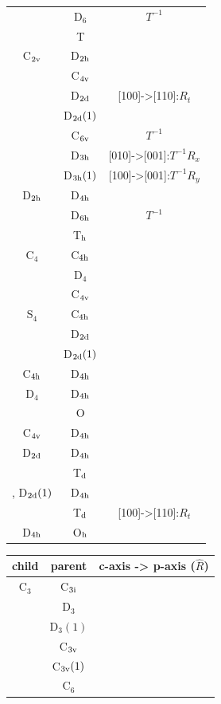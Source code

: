 \documentclass[11pt]{easymemo}
\begin{document}
\begin{table}[t]
\begin{center}
\begin{tabular}{ccc}
   & D$_6$ & $T^{-1}$ \\
   & T & \\ \hline
C$_{\rm 2v}$ & D$_{\rm 2h}$ & \\
    & C$_{\rm 4v}$ & \\
    & D$_{\rm 2d}$ & [100]->[110]:$R_t$ \\
    & D$_{\rm 2d}(1)$ & \\
    & C$_{\rm 6v}$ & $T^{-1}$ \\
    & D$_{\rm 3h}$ & [010]->[001]:$T^{-1}R_x$ \\
    & D$_{\rm 3h}(1)$ & [100]->[001]:$T^{-1}R_y$ \\ \hline
D$_{\rm 2h}$ & D$_{\rm 4h}$ & \\
    & D$_{\rm 6h}$ & $T^{-1}$ \\
    & T$_{\rm h}$ & \\ \hline\hline
C$_4$ & C$_{\rm 4h}$ & \\
   & D$_4$ & \\
   & C$_{\rm 4v}$ & \\ \hline
S$_4$ & C$_{\rm 4h}$ & \\
   & D$_{\rm 2d}$ & \\
   & D$_{\rm 2d}(1)$ & \\ \hline
C$_{\rm 4h}$ & D$_{\rm 4h}$ & \\ \hline
D$_4$ & D$_{\rm 4h}$ & \\
   & O & \\ \hline
C$_{\rm 4v}$ & D$_{\rm 4h}$ & \\ \hline
D$_{\rm 2d}$ & D$_{\rm 4h}$ & \\
    & T$_{\rm d}$ & \\ \hline,
D$_{\rm 2d}(1)$ & D$_{\rm 4h}$ & \\
      & T$_{\rm d}$ & [100]->[110]:$R_t$ \\ \hline
D$_{\rm 4h}$ & O$_{\rm h}$ & \\ \hline\hline
\end{tabular}
\hspace{1cm}
\begin{tabular}{ccc} \hline\hline
child & parent & c-axis -> p-axis ($\hat{R}$) \\ \hline
C$_3$ & C$_{\rm 3i}$ & \\
   & D$_3$ & \\
   & D$_3(1)$ & \\
   & C$_{\rm 3v}$ & \\
   & C$_{\rm 3v}(1)$ & \\
   & C$_6$ & \\

\end{tabular}
\end{center}
\end{table}
\end{document}
